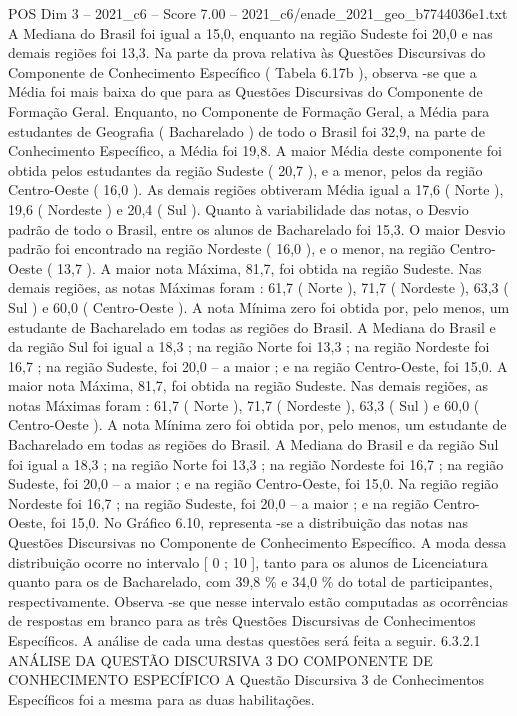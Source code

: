 \begin{textsample}{POS Dim 3 – 2021\_c6 – Score 7.00 – 2021\_c6/enade\_2021\_geo\_b7744036e1.txt}
A Mediana do Brasil foi igual a 15,0, enquanto na região Sudeste foi 20,0 e nas demais regiões foi 13,3.
Na parte da prova relativa às Questões Discursivas do Componente de Conhecimento Específico ( Tabela 6.17b ), observa -se que a Média foi mais baixa do que para as Questões Discursivas do Componente de Formação Geral.
Enquanto, no Componente de Formação Geral, a Média para estudantes de Geografia ( Bacharelado ) de todo o Brasil foi 32,9, na parte de Conhecimento Específico, a Média foi 19,8.
A maior Média deste componente foi obtida pelos estudantes da região Sudeste ( 20,7 ), e a menor, pelos da região Centro-Oeste ( 16,0 ).
As demais regiões obtiveram Média igual a 17,6 ( Norte ), 19,6 ( Nordeste ) e 20,4 ( Sul ).
Quanto à variabilidade das notas, o Desvio padrão de todo o Brasil, entre os alunos de Bacharelado foi 15,3.
O maior Desvio padrão foi encontrado na região Nordeste ( 16,0 ), e o menor, na região Centro-Oeste ( 13,7 ).
A maior nota Máxima, 81,7, foi obtida na região Sudeste.
Nas demais regiões, as notas Máximas foram : 61,7 ( Norte ), 71,7 ( Nordeste ), 63,3 ( Sul ) e 60,0 ( Centro-Oeste ).
A nota Mínima zero foi obtida por, pelo menos, um estudante de Bacharelado em todas as regiões do Brasil.
A Mediana do Brasil e da região Sul foi igual a 18,3 ; na região Norte foi 13,3 ; na região Nordeste foi 16,7 ; na região Sudeste, foi 20,0 – a maior ; e na região Centro-Oeste, foi 15,0.
A maior nota Máxima, 81,7, foi obtida na região Sudeste.
Nas demais regiões, as notas Máximas foram : 61,7 ( Norte ), 71,7 ( Nordeste ), 63,3 ( Sul ) e 60,0 ( Centro-Oeste ).
A nota Mínima zero foi obtida por, pelo menos, um estudante de Bacharelado em todas as regiões do Brasil.
A Mediana do Brasil e da região Sul foi igual a 18,3 ; na região Norte foi 13,3 ; na região Nordeste foi 16,7 ; na região Sudeste, foi 20,0 – a maior ; e na região Centro-Oeste, foi 15,0.
Na região região Nordeste foi 16,7 ; na região Sudeste, foi 20,0 – a maior ; e na região Centro-Oeste, foi 15,0.
No Gráfico 6.10, representa -se a distribuição das notas nas Questões Discursivas no Componente de Conhecimento Específico.
A moda dessa distribuição ocorre no intervalo [ 0 ; 10 ], tanto para os alunos de Licenciatura quanto para os de Bacharelado, com 39,8 \% e 34,0 \% do total de participantes, respectivamente.
Observa -se que nesse intervalo estão computadas as ocorrências de respostas em branco para as três Questões Discursivas de Conhecimentos Específicos.
A análise de cada uma destas questões será feita a seguir. 6.3.2.1 ANÁLISE DA QUESTÃO DISCURSIVA 3 DO COMPONENTE DE CONHECIMENTO ESPECÍFICO A Questão Discursiva 3 de Conhecimentos Específicos foi a mesma para as duas habilitações.

\end{textsample}
